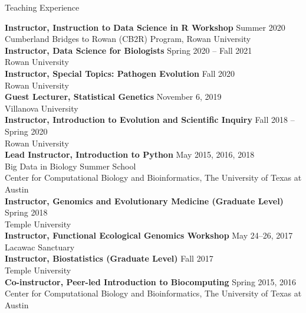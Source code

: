 \documentclass{resume} %
\begin{document}
\vspace*{0.5cm} 
\begin{rSection}{Teaching Experience}
\vspace*{0.25cm}

\textbf{Instructor, Instruction to Data Science in R Workshop} \hfill Summer 2020 \\ Cumberland Bridges to Rowan (CB2R) Program, Rowan University \\

\textbf{Instructor, Data Science for Biologists} \hfill Spring 2020 -- Fall 2021  \\ Rowan University \\

\textbf{Instructor, Special Topics: Pathogen Evolution} \hfill Fall 2020  \\ Rowan University \\

\textbf{Guest Lecturer, Statistical Genetics} \hfill November 6, 2019 \\ Villanova University \\ 

\textbf{Instructor, Introduction to Evolution and Scientific Inquiry} \hfill Fall 2018 -- Spring 2020  \\ Rowan University \\

\textbf{Lead Instructor, Introduction to Python} \hfill May 2015, 2016, 2018 \\ Big Data in Biology Summer School \\ Center for Computational Biology and Bioinformatics, The University of Texas at Austin \\

\textbf{Instructor, Genomics and Evolutionary Medicine (Graduate Level)} \hfill Spring 2018 \\ Temple University \\

\textbf{Instructor, Functional Ecological Genomics Workshop} \hfill May 24--26, 2017 \\ Lacawac Sanctuary \\

\textbf{Instructor, Biostatistics (Graduate Level)} \hfill Fall 2017 \\ Temple University \\

\textbf{Co-instructor, Peer-led Introduction to Biocomputing} \hfill Spring 2015, 2016 \\ Center for Computational Biology and Bioinformatics, The University of Texas at Austin \\


\end{rSection}
\end{document}
